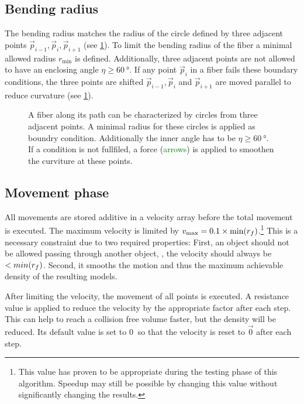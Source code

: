 \subsection{Bending radius}
%
The bending radius matches the radius of the circle defined by three adjacent points $\vec{p}_{i-1}, \vec{p}_{i}, \vec{p}_{i+1}$ (see \cref{fig:modelCircle}).
To limit the bending radius of the fiber a minimal allowed radius $r_{\min}$ is defined.
Additionally, three adjacent points are not allowed to have an enclosing angle $\eta \geq \SI{60}{\degree}$.
If any point $\vec{p}_{i}$ in a fiber fails these boundary conditions, the three points are shifted $\vec{p}_{i-1}, \vec{p}_{i}$ and $\vec{p}_{i+1}$ are moved parallel to reduce curvature (see \cref{fig:modelCircle}).
% 
\begin{figure}[!t]
    \centering
    \setlength{\tikzheight}{.75\textwidth}
	\caption{A fiber along its path can be characterized by circles from three adjacent points. A minimal radius for these circles is applied as boundry condition. Additionally the inner angle has to be $\eta \geq \SI{60}{\degree}$. If a condition is not fullfiled, a force (\textcolor{GREEN}{arrows}) is applied to smoothen the curviture at these points.}
	\label{fig:modelCircle}
\end{figure}
%
% 
% 
\subsection{Movement phase}
% 
All movements are stored additive in a velocity array before the total movement is executed.
The maximum velocity is limited by $v_{\max} = 0.1 \times \min(\mathit{\textnormal{$r_f$}})$.\footnote{This value has proven to be appropriate during the testing phase of this algorithm. Speedup may still be possible by changing this value without significantly changing the results.}
This is a necessary constraint due to two required properties:
First, an object should not be allowed passing through another object, \ie{}, the velocity should always be $<min(\textnormal{$r_f$})$.
Second, it smooths the motion and thus the maximum achievable density of the resulting models.
\par
% 
After limiting the velocity, the movement of all points is executed.
A resistance value is applied to reduce the velocity by the appropriate factor after each step.
This can help to reach a collision free volume faster, but the density will be reduced.
Its default value is set to $\SI{0}{}$ so that the velocity is reset to $\vec{0}$ after each step.
% 
% 
% 
